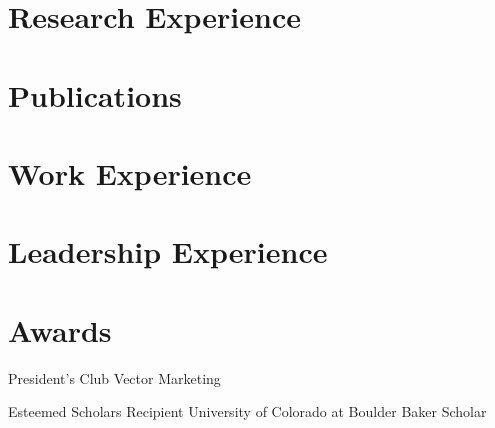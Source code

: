 \documentclass[11pt]{article} %
\begin{document}
\section{Research Experience}






\pagebreak[3]
\section{Publications}




\pagebreak[3]
\section{Work Experience}










\pagebreak[3]
\section{Leadership Experience}



\pagebreak[3]
\section{Awards}

    {}
    {President's Club}
    {Vector Marketing}
    {}

    {}
    {Esteemed Scholars Recipient}
    {University of Colorado at Boulder}
    {Baker Scholar}
        
\end{document}
